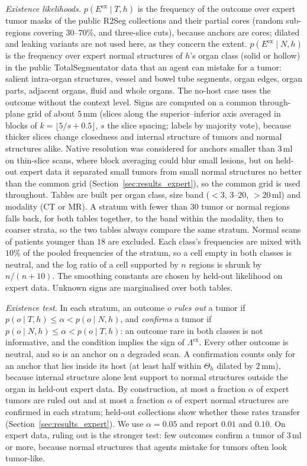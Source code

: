 \documentclass[fleqn,10pt]{olplainarticle}
\begin{document}
\emph{Existence likelihoods.} $p(E^{\mathrm{ex}}\mid T,h)$ is the frequency of the outcome over expert tumor masks of the
public R2Seg collections and their partial cores (random sub-regions covering $30$--$70\%$, and three-slice cuts), because
anchors are cores; dilated and leaking variants are not used here, as they concern the extent. $p(E^{\mathrm{ex}}\mid N,h)$ is
the frequency over expert normal structures of $h$'s organ class (solid or hollow) in the public TotalSegmentator data that
an agent can mistake for a tumor: salient intra-organ structures, vessel and bowel tube segments, organ edges, organ parts,
adjacent organs, fluid and whole organs. The no-host case uses the outcome without the context level. Signs are computed on a
common through-plane grid of about $5$\,mm (slices along the superior--inferior axis averaged in blocks of
$k=\lfloor5/s+0.5\rfloor$, $s$ the slice spacing; labels by majority vote), because thicker slices change closedness and
internal structure of tumors and normal structures alike. Native resolution was considered for anchors smaller than $3$\,ml
on thin-slice scans, where block averaging could blur small lesions, but on held-out expert data it separated small tumors
from small normal structures no better than the common grid (Section~\ref{sec:results_expert}), so the common grid is used
throughout. Tables are built per organ class, size band ($<3$, $3$--$20$, $>20$\,ml) and
modality (CT or MR). A stratum with fewer than $30$ tumor or normal regions falls back, for both tables together, to the band
within the modality, then to coarser strata, so the two tables always compare the same stratum. Normal scans of patients
younger than $18$ are excluded. Each class's frequencies are mixed with $10\%$ of the pooled frequencies of the stratum, so a
cell empty in both classes is neutral, and the log ratio of a cell supported by $n$ regions is shrunk by $n/(n+10)$. The smoothing constants are chosen by held-out likelihood on expert
data. Unknown signs are marginalised over both tables.

\emph{Existence test.} In each stratum, an outcome $o$ \emph{rules out} a tumor if $p(o\mid T,h)\le\alpha<p(o\mid N,h)$,
and \emph{confirms} a tumor if $p(o\mid N,h)\le\alpha<p(o\mid T,h)$: an outcome rare in both classes is not informative,
and the condition implies the sign of $\Lambda^{\mathrm{ex}}$. Every other outcome is neutral, and so is an anchor on a degraded scan. A confirmation counts only for an anchor that lies inside
its host (at least half within $\Theta_h$ dilated by $2$\,mm), because internal structure alone lent support to normal
structures outside the organ in held-out expert data. By construction, at most a fraction $\alpha$ of expert tumors are
ruled out and at most a fraction $\alpha$ of expert normal structures are confirmed in each stratum; held-out collections
show whether these rates transfer (Section~\ref{sec:results_expert}). We use $\alpha=0.05$ and report $0.01$ and $0.10$.
On expert data, ruling out is the stronger test: few outcomes confirm a tumor of $3$\,ml or more, because normal structures
that agents mistake for tumors often look tumor-like.
\end{document}
